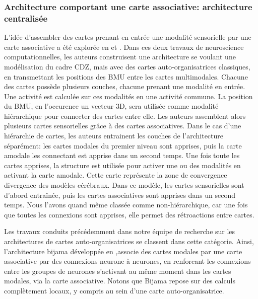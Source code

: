 \documentclass[../main]{subfiles}
\begin{document}
\subsubsection{Architecture comportant une carte associative: architecture centralisée}

L'idée d'assembler des cartes prenant en entrée une modalité sensorielle par une carte associative a été explorée en \cite{dominey13} et \cite{escobar-juarez_self-organized_2016}.
Dans ces deux travaux de neuroscience computationnelles, les auteurs construisent une architecture se voulant une modélisation du cadre CDZ, mais avec des cartes auto-organisatrices classiques, en transmettant les positions des BMU entre les cartes multimodales. 
Chacune des cartes possède plusieurs couches, chacune prenant une modalité en entrée. Une activité est calculée sur ces modalités en une activité commune. La position du BMU, en l'occurence un vecteur 3D, sera utilisée comme modalité hiérarchique pour connecter des cartes entre elle. Les auteurs assemblent alors plusieurs cartes sensorielles grâce à des cartes associatives.
Dans le cas d'une hiérarchie de cartes, les auteurs entrainent les couches de l'architecture séparément: les cartes modales du premier niveau sont apprises, puis la carte amodale les connectant est apprise dans un second temps. 
Une fois toute les cartes apprises, la structure est utilisée pour activer une ou des modalités en activant la carte amodale. Cette carte représente la zone de convergence divergence des modèles cérébraux. 
Dans ce modèle, les cartes sensorielles sont d'abord entraînée, puis les cartes associatives sont apprises dans un second temps. Nous l'avons quand même classée comme non-hiérarchique, car une fois que toutes les connexions sont apprises, elle permet des rétroactions entre cartes. 

Les travaux conduits précédemment dans notre équipe de recherche sur les architectures de cartes auto-organisatrices se classent dans cette catégorie. Ainsi, l'architecture bijama développée en \cite{menard05,khouzam_2013},associe des cartes modales par une carte associative par des connexions neurone à neurones, en renforcant les connexions entre les groupes de neurones s'activant au même moment dans les cartes modales, via la carte associative.
Notons que Bijama repose sur des calculs complètement locaux, y compris au sein d'une carte auto-organisatrice.
\end{document}
